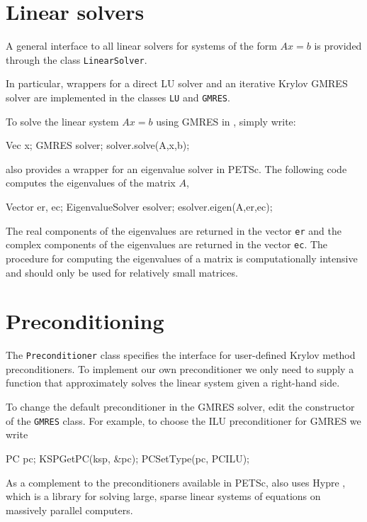 \section{Linear solvers}

A general interface to all linear solvers for systems of the form 
$Ax=b$ is provided through the class \texttt{LinearSolver}. 

In particular, wrappers for a direct LU solver and an iterative 
Krylov GMRES solver are implemented in the classes \texttt{LU} and \texttt{GMRES}. 

To solve the linear system $Ax=b$ using GMRES in \dolfin{}, simply write:  
%
\begin{code} 
Vec x;
GMRES solver; 
solver.solve(A,x,b);
\end{code} 
%
\dolfin{} also provides a wrapper for an eigenvalue 
solver in PETSc. The following code computes the 
eigenvalues of the matrix $A$,
\begin{code} 
Vector er, ec;
EigenvalueSolver esolver; 
esolver.eigen(A,er,ec);
\end{code} 
The real components of the eigenvalues are returned in the vector \texttt{er} and
the complex components of the eigenvalues are returned in the vector \texttt{ec}.
The procedure for computing the eigenvalues of a matrix is computationally 
intensive and should only be used for relatively small matrices.


\section{Preconditioning}

The \texttt{Preconditioner} class specifies the interface for user-defined 
Krylov method preconditioners. To implement our own preconditioner we only 
need to supply a function that approximately solves the linear system given 
a right-hand side.

To change the default preconditioner in the \dolfin{} GMRES solver, edit the 
constructor of the \texttt{GMRES} class. For example, to choose the 
ILU preconditioner for GMRES we write 
%
\begin{code}
PC pc;
KSPGetPC(ksp, &pc);
PCSetType(pc, PCILU);
\end{code}

As a complement to the preconditioners available in PETSc, 
\dolfin{} also uses Hypre \cite{www:hypre}, which is a 
library for solving large, sparse linear systems of equations on 
massively parallel computers. 

